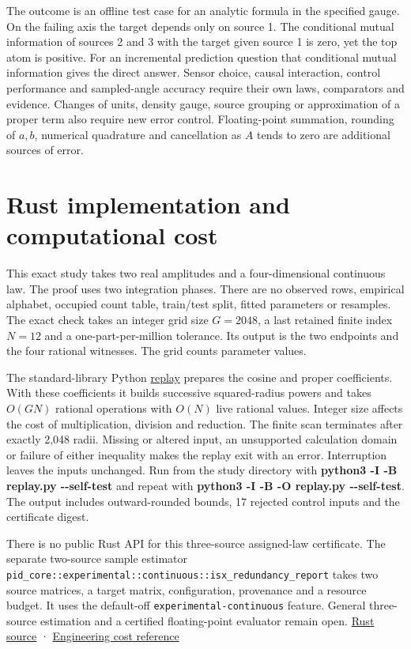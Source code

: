 The outcome is an offline test case for an analytic formula in the specified gauge. On the failing axis the target depends only on source 1. The conditional mutual information of sources 2 and 3 with the target given source 1 is zero, yet the top atom is positive. For an incremental prediction question that conditional mutual information gives the direct answer. Sensor choice, causal interaction, control performance and sampled-angle accuracy require their own laws, comparators and evidence. Changes of units, density gauge, source grouping or approximation of a proper term also require new error control. Floating-point summation, rounding of \(a,b\), numerical quadrature and cancellation as \(A\) tends to zero are additional sources of error.

\clearpage

\section{Rust implementation and computational cost}\label{rust-implementation-and-computational-cost}

This exact study takes two real amplitudes and a four-dimensional continuous law. The proof uses two integration phases. There are no observed rows, empirical alphabet, occupied count table, train/test split, fitted parameters or resamples. The exact check takes an integer grid size \(G=2048\), a last retained finite index \(N=12\) and a one-part-per-million tolerance. Its output is the two endpoints and the four rational witnesses. The grid counts parameter values.

The standard-library Python \href{https://github.com/sepahead/pid-rs/blob/main/audit/research/angular-four-moment-radius/replay.py}{replay} prepares the cosine and proper coefficients. With these coefficients it builds successive squared-radius powers and takes \(O(GN)\) rational operations with \(O(N)\) live rational values. Integer size affects the cost of multiplication, division and reduction. The finite scan terminates after exactly 2,048 radii. Missing or altered input, an unsupported calculation domain or failure of either inequality makes the replay exit with an error. Interruption leaves the inputs unchanged. Run from the study directory with \textbf{python3 -I -B replay.py -\/-self-test} and repeat with \textbf{python3 -I -B -O replay.py -\/-self-test}. The output includes outward-rounded bounds, 17 rejected control inputs and the certificate digest.

There is no public Rust API for this three-source assigned-law certificate. The separate two-source sample estimator \texttt{pid\_core::experimental::continuous::isx\_redundancy\_report} takes two source matrices, a target matrix, configuration, provenance and a resource budget. It uses the default-off \texttt{experimental-continuous} feature. General three-source estimation and a certified floating-point evaluator remain open. \href{https://github.com/sepahead/pid-rs/blob/main/crates/pid-core/src/isx.rs}{Rust source} · \href{https://github.com/sepahead/pid-rs/blob/main/RUST_IMPLEMENTATION_AND_COST.md}{Engineering cost reference}

